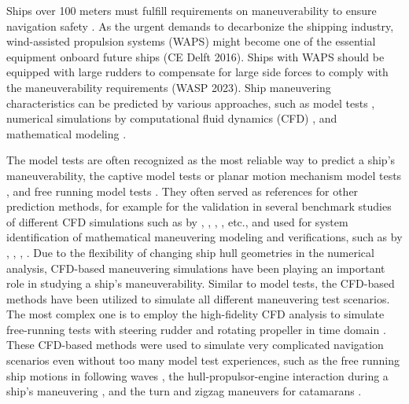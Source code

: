 Ships over 100 meters must fulfill requirements on maneuverability to ensure navigation safety \citep{imoStandardsShipManoeuvrability2002}. As the urgent demands to decarbonize the shipping industry, wind-assisted propulsion systems (WAPS) might become one of the essential equipment onboard future ships (CE Delft 2016). Ships with WAPS should be equipped with large rudders to compensate for large side forces to comply with the maneuverability requirements (WASP 2023). Ship maneuvering characteristics can be predicted by various approaches, such as model tests \citep{ittcManeuveringCommitteeITTC2008}, numerical simulations by computational fluid dynamics (CFD) \citep{elmoctarRANSBasedSimulatedShip2014,dumanTurnZigzagManoeuvres2022}, and mathematical modeling \citep{abkowitzMEASUREMENTHYDRODYNAMICCHARACTERISTICS1980,fossenHandbookMarineCraft2011,yasukawaIntroductionMMGStandard2015,alexanderssonSystemIdentificationPhysicsinformed2024b}. 

The model tests are often recognized as the most reliable way to predict a ship’s maneuverability, the captive model tests or planar motion mechanism model tests \citep{ittcITTCRecommendedProcedures2008}, and free running model tests \citep{FinalReportRecommendations2021}. They often served as references for other prediction methods, for example for the validation in several benchmark studies of different CFD simulations such as by \citet{sternExperienceSIMMAN20082011}, \citet{sakamotoURANSSimulationsStatic2012}, \citet{yoonBenchmarkCFDValidation2015a}, \citet{yasukawaValidation6DOFMotion2021}, etc., and used for system identification of mathematical maneuvering modeling and verifications, such as by \citet{luoParameterIdentificationShip2016}, \citet{xuUncertaintyAnalysisHydrodynamic2019}, \citet{wangOptimalDesignExcitation2020}, \citet{alexanderssonSystemIdentificationVessel2022}. Due to the flexibility of changing ship hull geometries in the numerical analysis, CFD-based maneuvering simulations have been playing an important role in studying a ship’s maneuverability. Similar to model tests, the CFD-based methods have been utilized to simulate all different maneuvering test scenarios. The most complex one is to employ the high-fidelity CFD analysis to simulate free-running tests with steering rudder and rotating propeller in time domain \citep{dubbiosoTurningAbilityAnalysis2016a, islamEstimationHydrodynamicDerivatives2018}. These CFD-based methods were used to simulate very complicated navigation scenarios even without too many model test experiences, such as the free running ship motions in following waves \citep{arakiImprovedManeuveringBasedMathematical2019}, the hull-propulsor-engine interaction during a ship’s maneuvering \citep{elmoctarRANSBasedSimulatedShip2014}, and the turn and zigzag maneuvers for catamarans \citep{dumanTurnZigzagManoeuvres2022}.

